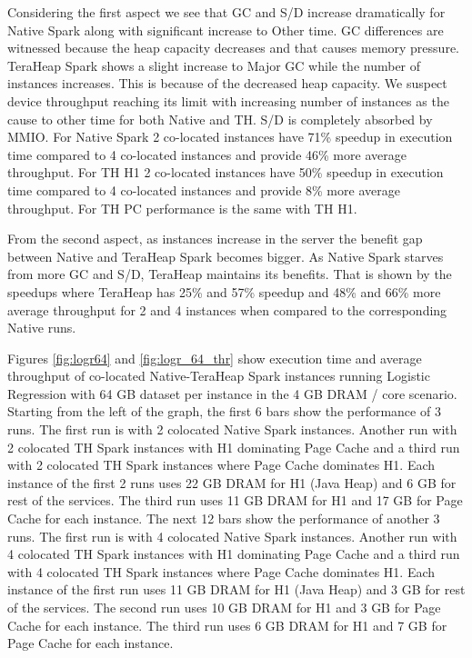 Considering the first aspect we see that GC and S/D increase dramatically for Native Spark along with significant increase to Other time. GC differences are witnessed because the heap capacity decreases and that causes memory pressure. TeraHeap Spark shows a slight increase to Major GC while the number of instances increases. This is because of the decreased heap capacity. We suspect device throughput reaching its limit with increasing number of instances as the cause to other time for both Native and TH. S/D is completely absorbed by MMIO. For Native Spark 2 co-located instances have 71\% speedup in execution time compared to 4 co-located instances and provide 46\% more average throughput. For TH H1 2 co-located instances have 50\% speedup in execution time compared to 4 co-located instances and provide 8\% more average throughput. For TH PC performance is the same with TH H1.

From the second aspect, as instances increase in the server the benefit gap between Native and TeraHeap Spark becomes bigger. As Native Spark starves from more GC and S/D, TeraHeap maintains its benefits. That is shown by the speedups where TeraHeap has 25\% and 57\% speedup and 48\% and 66\% more average throughput for 2 and 4 instances when compared to the corresponding Native runs.

Figures \ref{fig:logr64} and \ref{fig:logr_64_thr} show execution time and average throughput of co-located
Native-TeraHeap Spark instances running Logistic Regression with 64 GB
dataset per instance in the 4 GB DRAM / core scenario.
Starting from the left of the graph, the first 6 bars show the
performance of 3 runs. The first run is with 2 colocated Native Spark instances.
Another run with 2 colocated TH Spark instances with H1 dominating Page Cache
and a third run with 2 colocated TH Spark instances where Page Cache dominates H1.
Each instance of the first 2 runs uses 22 GB DRAM for H1 (Java Heap) and 6 GB for rest of the services.
The third run uses 11 GB DRAM for H1 and 17 GB for Page Cache for each instance. 
The next 12 bars show the performance of another 3 runs. The first run is with 4 colocated Native Spark instances.
Another run with 4 colocated TH Spark instances with H1 dominating Page Cache
and a third run with 4 colocated TH Spark instances where Page Cache dominates H1.
Each instance of the first run uses 11 GB DRAM for H1 (Java Heap) and 3 GB for rest of the services.
The second run uses 10 GB DRAM for H1 and 3 GB for Page Cache for each instance.
The third run uses 6 GB DRAM for H1 and 7 GB for Page Cache for each instance.

